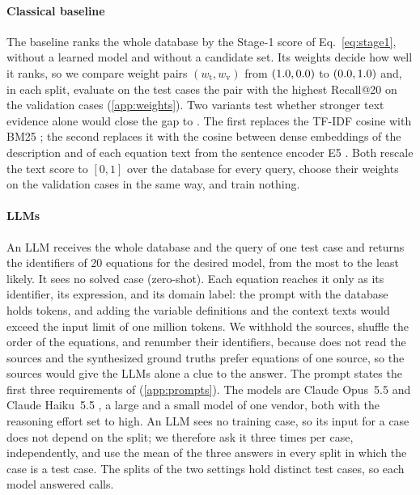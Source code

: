 \paragraph{Classical baseline} The baseline ranks the whole database by the Stage-1 score of
Eq.~\eqref{eq:stage1}, without a learned model and without a candidate set. Its weights decide how
well it ranks, so we compare \NBasePairs{} weight pairs $(w_{\mathrm{t}}, w_{\mathrm{v}})$ from
$(1.0, 0.0)$ to $(0.0, 1.0)$ and, in each split, evaluate on the test cases the pair with the highest Recall@20 on
the validation cases (\ref{app:weights}). Two variants test whether stronger text evidence alone
would close the gap to \ours{}. The first replaces the TF-IDF cosine with BM25
\citep{BM25}; the second replaces it with the cosine between dense embeddings of the description
and of each equation text from the sentence encoder E5 \citep{E5}. Both rescale the text score to
$[0, 1]$ over the database for every query, choose their weights on the validation cases in the
same way, and train nothing.

\paragraph{LLMs} An LLM receives the whole database and the query of one test case and returns the
identifiers of 20 equations for the desired model, from the most to the least likely. It sees no
solved case (zero-shot). Each equation reaches it only as its identifier, its expression, and its
domain label: the prompt with the database holds \NDbTokens{} tokens, and adding the variable
definitions and the context texts would exceed the input limit of one million tokens. We withhold
the sources, shuffle the order of the equations, and renumber their identifiers, because \ours{} does not read the sources and the synthesized ground truths prefer equations of one
source, so the sources would give the LLMs alone a clue to the answer. The prompt states the first
three requirements of  (\ref{app:prompts}). The models are Claude
Opus~5.5 and Claude Haiku~5.5 \citep{ClaudeModels}, a large and a small model of one vendor, both
with the reasoning effort set to high. An LLM sees no training case, so its input for a case does
not depend on the split; we therefore ask it three times per case, independently, and use the mean
of the three answers in every split in which the case is a test case. The splits of the two
settings hold \NTestDistinct{} distinct test cases, so each model answered \NCalls{} calls.

